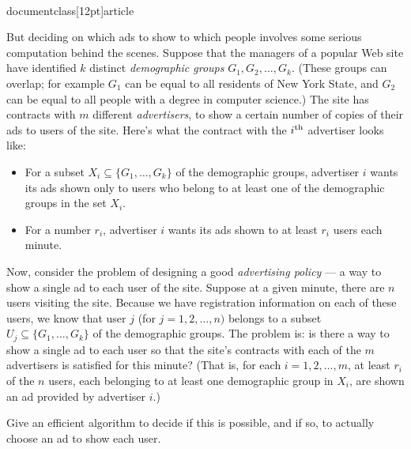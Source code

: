 \\documentclass[12pt]{article}
\begin{document}
\begin{enumerate}
But deciding on which ads to show to which people
involves some serious computation behind the scenes.
Suppose that the managers of a popular Web site have
identified $k$ distinct {\em demographic groups}
$G_1, G_2, \ldots, G_k$.
(These groups can overlap; for example $G_1$ can be equal
to all residents of New York State, and $G_2$ can be equal to all
people with a degree in computer science.)
The site has contracts with $m$ different {\em advertisers},
to show a certain number of copies of their ads to users of the site.
Here's what the contract with the $i^{\rm th}$ advertiser looks like:
\begin{itemize}
\item For a subset $X_i \subseteq \{G_1, \ldots, G_k\}$ of the
demographic groups, advertiser $i$ wants its ads shown only
to users who belong to at least one of the demographic
groups in the set $X_i$.
\item For a number $r_i$, advertiser $i$ wants its ads
shown to at least $r_i$ users each minute.
\end{itemize}

Now, consider the problem of designing a good
{\em advertising policy} --- a way to show a single
ad to each user of the site.
Suppose at a given minute, there are $n$ users visiting the site.
Because we have registration information on each of these users,
we know that user $j$ (for $j = 1, 2, \ldots, n)$
belongs to a subset $U_j \subseteq \{G_1, \ldots, G_k\}$
of the demographic groups.
The problem is: is there a way to show a single ad
to each user so that the site's contracts
with each of the $m$ advertisers is satisfied for this minute?
(That is, for each $i = 1, 2, \ldots, m$, at least
$r_i$ of the $n$ users,
each belonging to at least one demographic group in $X_i$,
are shown an ad provided by advertiser $i$.)

Give an efficient algorithm to decide if this is possible,
and if so, to actually choose an ad to show each user.

\end{enumerate}
\end{document}
